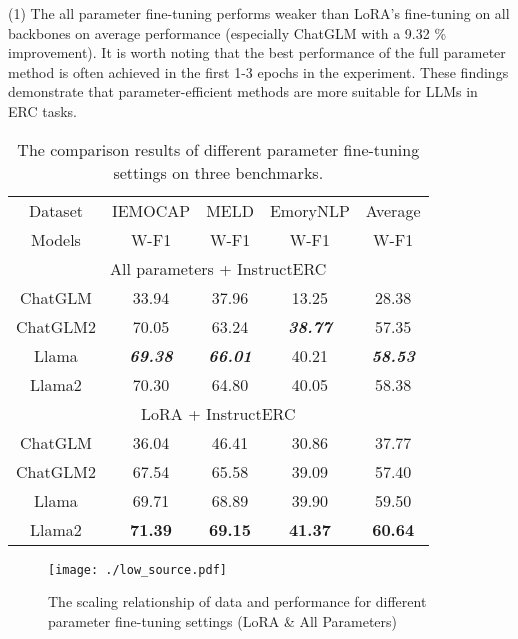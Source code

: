\documentclass[conference]{IEEEtran}
\begin{document}
(1) The all parameter fine-tuning performs weaker than LoRA's fine-tuning on all backbones on average performance (especially ChatGLM with a 9.32 \% improvement). It is worth noting that the best performance of the full parameter method is often achieved in the first 1-3 epochs in the experiment. These findings demonstrate that parameter-efficient methods are more suitable for LLMs in ERC tasks.
\begin{table}[htbp]
\caption{The comparison results of different parameter fine-tuning settings on three benchmarks.}
\centering
\begin{tabular}{ccccc}
\toprule
 Dataset          & IEMOCAP                    & MELD                       & EmoryNLP                   & Average \\
{Models}                   & {W-F1}       & {W-F1}       & {W-F1}       & {W-F1} \\
\midrule
 \multicolumn{5}{c}{All parameters + InstructERC}       \\
\midrule 

ChatGLM                       & {33.94} & {37.96} & {13.25} & 28.38 \\
ChatGLM2                      & {70.05} & {63.24}  &\textbf{\textit{38.77}} & 57.35 \\
Llama                         & \textbf{\textit{69.38}} & \textbf{\textit{66.01}}  & {40.21} & \textbf{\textit{58.53}} \\
Llama2                        & {70.30} & {64.80} & {40.05} & 58.38 \\
\midrule
\multicolumn{5}{c}{LoRA + InstructERC}       \\
\midrule 
 
ChatGLM                               & 36.04                   & 46.41                 & 30.86             & 37.77 \\
ChatGLM2                               & 67.54                     & 65.58              & 39.09             & 57.40 \\
Llama                                  & 69.71                     & 68.89              & 39.90             & 59.50 \\
Llama2                                 & \textbf{71.39}         & \textbf{69.15}        & \textbf{41.37}    & \textbf{60.64} \\
\bottomrule
\end{tabular}
\label{tab5}
\vspace{-0.2cm}
\end{table}
\begin{figure*}[t]
\centering
\texttt{[image: ./low\_source.pdf]} \caption{The scaling relationship of data and performance for different parameter fine-tuning settings (LoRA \& All Parameters)}
\label{fig4}
\end{figure*}
\end{document}
